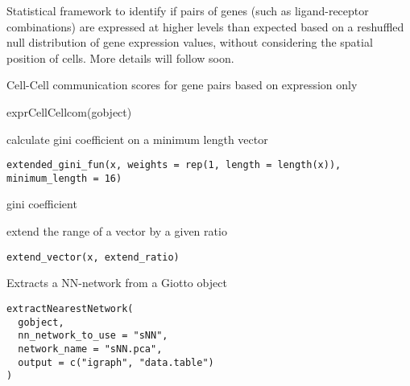 \documentclass[a4paper]{book}
\begin{document}
%
\begin{Details}\relax
Statistical framework to identify if pairs of genes (such as ligand-receptor combinations)
are expressed at higher levels than expected based on a reshuffled null distribution of gene expression values,
without considering the spatial position of cells.
More details will follow soon.
\end{Details}
%
\begin{Value}
Cell-Cell communication scores for gene pairs based on expression only
\end{Value}
%
\begin{Examples}
\begin{ExampleCode}
    exprCellCellcom(gobject)
\end{ExampleCode}
\end{Examples}
%
\begin{Description}\relax
calculate gini coefficient on a minimum length vector
\end{Description}
%
\begin{Usage}
\begin{verbatim}
extended_gini_fun(x, weights = rep(1, length = length(x)), minimum_length = 16)
\end{verbatim}
\end{Usage}
%
\begin{Value}
gini coefficient
\end{Value}
%
\begin{Description}\relax
extend the range of a vector by a given ratio
\end{Description}
%
\begin{Usage}
\begin{verbatim}
extend_vector(x, extend_ratio)
\end{verbatim}
\end{Usage}
%
\begin{Description}\relax
Extracts a NN-network from a Giotto object
\end{Description}
%
\begin{Usage}
\begin{verbatim}
extractNearestNetwork(
  gobject,
  nn_network_to_use = "sNN",
  network_name = "sNN.pca",
  output = c("igraph", "data.table")
)
\end{verbatim}
\end{Usage}
\end{document}
